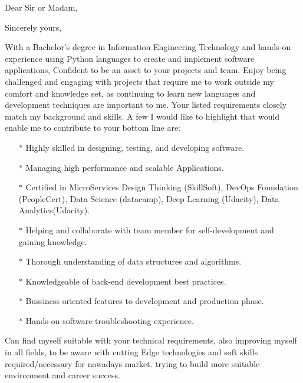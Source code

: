 \documentclass{subfiles}
\begin{document}
\clearpage
{} %
\date{\today} %
\opening{Dear Sir or Madam,} %
\closing{Sincerely yours,} %

\makelettertitle %
With a Bachelor’s degree in Information Engineering Technology and hands-on experience using Python languages to create and implement software applications, Confident to be an asset to your projects and team.
\newline
Enjoy being challenged and engaging with projects that require me to work outside my comfort and knowledge set, as continuing to learn new languages and development techniques are important to me.
\newline
Your listed requirements closely match my background and skills. A few I would like to highlight that would enable me to contribute to your bottom line are:

\begin{itemize}
        \item[$\ast$] Highly skilled in designing, testing, and developing software.
        \item[$\ast$] Managing high performance and scalable Applications.
	\item[$\ast$] Certified in MicroServices Design Thinking (SkillSoft), DevOps Foundation (PeopleCert), Data Science (datacamp), 
                        Deep Learning (Udacity), Data Analytics(Udacity).
        \item[$\ast$] Helping and collaborate with team member for self-development and gaining knowledge.
        \item[$\ast$] Thorough understanding of data structures and algorithms.
        \item[$\ast$] Knowledgeable of back-end development best practices.
        \item[$\ast$] Bussiness oriented features to development and production phase.
        \item[$\ast$] Hands-on software troubleshooting experience.
\end{itemize}

Can find myself suitable with your technical requirements, also improving myself in all fields, 
to be aware with cutting Edge technologies and soft skills required/necessary for nowadays market. 
trying to build more suitable environment and career success.
\end{document}
